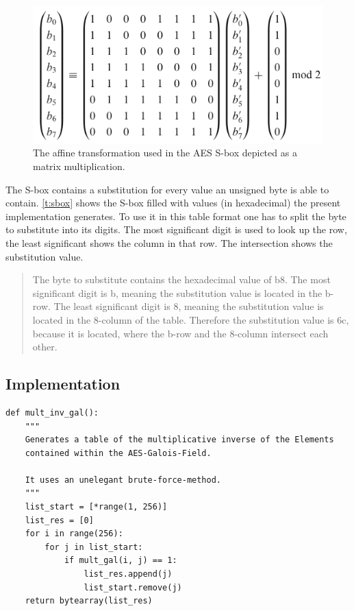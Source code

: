 \begin{figure}
\centering
\includegraphics[scale = 0.3]{data/figures/affinetrans.png}
\caption{The affine transformation used in the AES S-box depicted as a matrix multiplication.}
\end{figure}

The S-box contains a substitution for every value an unsigned byte is
able to contain. \ref{t:sbox} shows the S-box filled with values (in
hexadecimal) the present implementation generates. To use it in this
table format one has to split the byte to substitute into its digits.
The most significant digit is used to look up the row, the least
significant shows the column in that row. The intersection shows the
substitution value.

\begin{quote}
The byte to substitute contains the hexadecimal value of b8. The most
significant digit is b, meaning the substitution value is located in the
b-row. The least significant digit is 8, meaning the substitution value
is located in the 8-column of the table. Therefore the substitution
value is 6c, because it is located, where the b-row and the 8-column
intersect each other.
\end{quote}

\hypertarget{implementation-1}{%
\subsection{Implementation}\label{implementation-1}}

\begin{lstlisting}
def mult_inv_gal():
    """
    Generates a table of the multiplicative inverse of the Elements
    contained within the AES-Galois-Field.

    It uses an unelegant brute-force-method.
    """
    list_start = [*range(1, 256)]
    list_res = [0]
    for i in range(256):
        for j in list_start:
            if mult_gal(i, j) == 1:
                list_res.append(j)
                list_start.remove(j)
    return bytearray(list_res)
\end{lstlisting}

